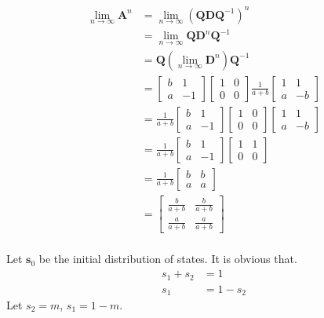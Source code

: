 \documentclass[a4paper]{article}
\newcommand{\vv}{\mathbf}
\begin{document}
\[\begin{aligned}
	\lim\limits_{n\to\infty}\vv A^n
	&=\lim\limits_{n\to\infty}\left(\vv Q\vv D\vv Q^{-1}\right)^n\\
	&=\lim\limits_{n\to\infty}\vv Q\vv D^n\vv Q^{-1}\\
	&=\vv Q\left(\lim\limits_{n\to\infty}\vv D^n\right)\vv Q^{-1}\\
	&=
	\begin{bmatrix}b&1\\a&-1\end{bmatrix}
	\begin{bmatrix}1&0\\0&0\end{bmatrix}
	\frac1{a+b}\begin{bmatrix}1&1\\a&-b\end{bmatrix}\\
	&=\frac1{a+b}
	\begin{bmatrix}b&1\\a&-1\end{bmatrix}
	\begin{bmatrix}1&0\\0&0\end{bmatrix}
	\begin{bmatrix}1&1\\a&-b\end{bmatrix}\\
	&=\frac1{a+b}
	\begin{bmatrix}b&1\\a&-1\end{bmatrix}
	\begin{bmatrix}1&1\\0&0\end{bmatrix}\\
	&=\frac1{a+b}
	\begin{bmatrix}b&b\\a&a\end{bmatrix}\\
			&=\begin{bmatrix}\frac b{a+b}&\frac b{a+b}\\\frac a{a+b}&\frac a{a+b}\end{bmatrix}\\
\end{aligned}\]

Let \(\vv s_0\) be the initial distribution of states.
It is obvious that.
\[\begin{aligned}
	s_1+s_2&=1\\
	s_1&=1-s_2
\end{aligned}\]
Let \(s_2=m\), \(s_1=1-m\).
\end{document}
